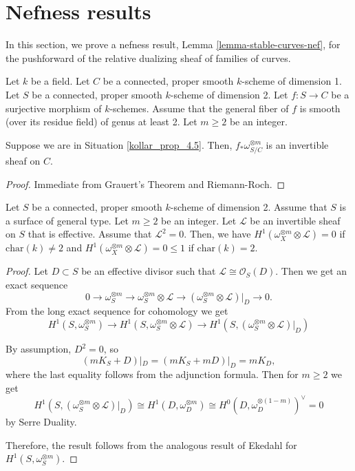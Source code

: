 \section{Nefness results}
In this section, we prove a nefness result,
Lemma \ref{lemma-stable-curves-nef}, for the pushforward of the
relative dualizing sheaf of families of curves.

\begin{situation}\label{kollar_prop_4.5}
Let $k$ be a field.
Let $C$ be a connected, proper smooth $k$-scheme of dimension 1.
Let $S$ be a connected, proper smooth $k$-scheme of dimension 2.
Let $f:S\to C$ be a surjective morphism of $k$-schemes.
Assume that the general fiber of $f$ is smooth (over its residue field) of genus at least 2.
Let $m\ge2$ be an integer.
\end{situation}

\begin{lemma}\label{pushforward_invertible}
Suppose we are in Situation \ref{kollar_prop_4.5}.
Then, $f_*\omega_{S/C}^{\otimes m}$ is an invertible sheaf on $C$.
\end{lemma}

\begin{proof}
Immediate from Grauert's Theorem and Riemann-Roch.
\end{proof}


\begin{lemma}\label{ekedahl_corollary}
Let $S$ be a connected, proper smooth $k$-scheme of dimension 2.
Assume that $S$ is a surface of general type.
Let $m\ge2$ be an integer.
Let $\mathcal{L}$ be an invertible sheaf on $S$ that is effective.
Assume that $\mathcal{L}^2=0$.
Then, we have $H^1(\omega_X^{\otimes m}\otimes\mathcal{L})=0$ if $\mathrm{char}(k)\neq2$ and  $H^1(\omega_X^{\otimes m}\otimes\mathcal{L})=0\leq 1$ if $\mathrm{char}(k)=2$.
\end{lemma}
\begin{proof}
Let $D\subset S$ be an effective divisor such that $\mathcal{L}\cong\mathcal{O}_S(D)$.
Then we get an exact sequence
$$
0\to \omega_S^{\otimes m}\to \omega^{\otimes m}_S\otimes \mathcal{L}\to (\omega_S^{\otimes m}\otimes \mathcal{L})|_D\to 0.
$$
From the long exact sequence for cohomology we get
$$
H^1(S,\omega_S^{\otimes m})\to H^1(S,\omega_S^{\otimes m}\otimes \mathcal{L})\to H^1(S,(\omega_S^{\otimes m}\otimes \mathcal{L})|_D)
$$

By assumption, $D^2=0$, so
$$
(mK_S+D)|_D=(mK_S+mD)|_D=mK_D,
$$
where the last equality follows from the adjunction formula.
Then for $m\geq 2$ we get
$$
H^1(S,(\omega_S^{\otimes m}\otimes \mathcal{L})|_D)\cong H^1(D,\omega_D^{\otimes m})\cong H^0(D,\omega_D^{\otimes(1-m)})^\vee=0
$$
by Serre Duality.

Therefore, the result follows from the analogous result of Ekedahl for $H^{1}(S,\omega_S^{\otimes m})$.
\end{proof}




